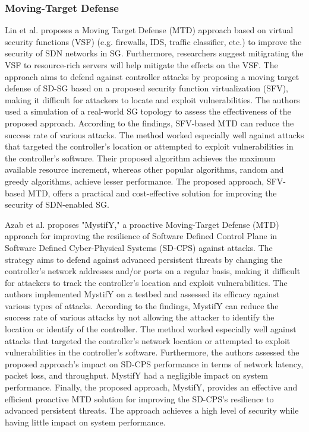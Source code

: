 \documentclass[conference]{IEEEtran}
\begin{document}
\subsubsection{Moving-Target Defense}

 Lin et al. \cite{lin2019security} proposes a Moving Target Defense (MTD) approach based on virtual security functions (VSF) (e.g. firewalls, IDS, traffic classifier, etc.) to improve the security of SDN networks in SG. Furthermore, researchers suggest mitigrating the VSF to resource-rich servers will help mitigate the effects on the VSF. The approach aims to defend against controller attacks by proposing a moving target defense of SD-SG based on a proposed security function virtualization (SFV), making it difficult for attackers to locate and exploit vulnerabilities. The authors used a simulation of a real-world SG topology to assess the effectiveness of the proposed approach. According to the findings, SFV-based MTD can reduce the success rate of various attacks. The method worked especially well against attacks that targeted the controller's location or attempted to exploit vulnerabilities in the controller's software.  Their proposed algorithm achieves the maximum available resource increment, whereas other popular algorithms, random and greedy algorithms, achieve lesser performance. The proposed approach, SFV-based MTD, offers a practical and cost-effective solution for improving the security of SDN-enabled SG. 

Azab et al. \cite{azab2022mystify} proposes "MystifY," a proactive Moving-Target Defense (MTD) approach for improving the resilience of Software Defined Control Plane in Software Defined Cyber-Physical Systems (SD-CPS) against attacks. The strategy aims to defend against advanced persistent threats by changing the controller's network addresses and/or ports on a regular basis, making it difficult for attackers to track the controller's location and exploit vulnerabilities. The authors implemented MystifY on a testbed and assessed its efficacy against various types of attacks. According to the findings, MystifY can reduce the success rate of various attacks by not allowing the attacker to identify the location or identify of the controller. The method worked especially well against attacks that targeted the controller's network location or attempted to exploit vulnerabilities in the controller's software. Furthermore, the authors assessed the proposed approach's impact on SD-CPS performance in terms of network latency, packet loss, and throughput. MystifY had a negligible impact on system performance. Finally, the proposed approach, MystifY, provides an effective and efficient proactive MTD solution for improving the SD-CPS's resilience to advanced persistent threats. The approach achieves a high level of security while having little impact on system performance.
\end{document}
